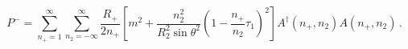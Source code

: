 \begin{equation}
P^-=\sum_{n_+=1}^\infty\sum_{n_2=-\infty}^\infty \frac{R_+}{2n_+}
[ m^2 +\frac{n_2^2}{R_2^2 \sin\theta^2} (1-\frac{n_+}{n_2}\tau_1
)^2] A^\dagger(n_+,n_2)A(n_+,n_2)\,.
\end{equation}

